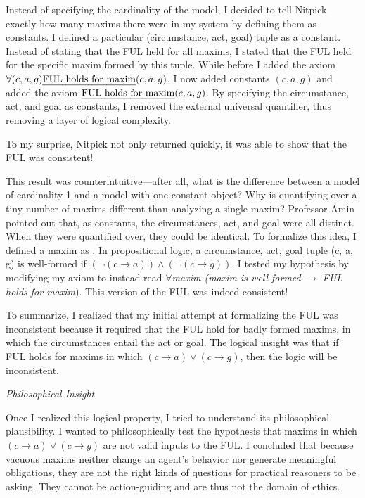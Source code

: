 \begin{isabellebody}
\begin{isamarkuptext}
Instead of specifying the cardinality of the model, I decided to tell Nitpick exactly how many 
maxims there were in my system by defining them as constants. I defined a particular 
(circumstance, act, goal) tuple as a constant. Instead of
stating that the FUL held for all maxims, I stated that the FUL held for the specific maxim formed by this tuple.
While before I added the axiom $\forall (c, a, g) \text{\emph{FUL holds for maxim}} (c, a, g)$, I now added constants $(c, a, g)$ 
and added the axiom $\text{\emph{FUL holds for maxim}} (c, a, g)$. By specifying the circumstance, act, and goal 
as constants, I removed the external universal quantifier, thus removing a layer of logical complexity.

To my surprise, Nitpick not only returned quickly, it was able to show that the FUL was consistent!

This result was counterintuitive—after all, what is the difference between a model of cardinality 
1 and a model with one constant object? Why is quantifying over a tiny number of maxims different
 than analyzing a single maxim? Professor Amin pointed out that, as constants, the 
circumstances, act, and goal were all distinct. When they were quantified over, 
they could be identical. To formalize this idea, I defined a maxim as . In propositional 
logic, a circumstance, act, goal tuple (c, a, g) is well-formed if $(\neg (c \longrightarrow a) ) \wedge 
(\neg(c \longrightarrow g))$. I tested my hypothesis by modifying my axiom to instead read $\forall$\emph{maxim
(maxim is well-formed} $\longrightarrow$ \emph{FUL holds for maxim}). This version of the FUL was indeed consistent!

To summarize, I realized that my initial attempt at formalizing the FUL was inconsistent because 
it required that the FUL hold for badly formed maxims, in which the circumstances entail the act or 
goal. The logical insight was that if FUL holds for maxims in which $(c \longrightarrow a) \vee 
(c \longrightarrow g)$, then the logic will be inconsistent.

\emph{Philosophical Insight}

Once I realized this logical property, I tried to understand its philosophical plausibility. I 
wanted to philosophically test the hypothesis that maxims in which  $(c \longrightarrow a) \vee 
(c \longrightarrow g)$ are not valid inputs to the FUL. I concluded that because vacuous maxims neither 
change an agent's behavior nor generate meaningful obligations, they are not the right kinds of questions 
for practical reasoners to be asking. They cannot be action-guiding and are thus not the domain of ethics.


\end{isamarkuptext}
\end{isabellebody}
